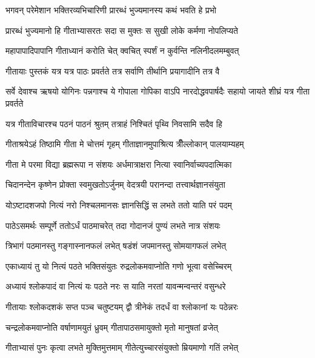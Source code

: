 \twolineshloka
{भगवन् परेमेशान भक्तिरव्यभिचारिणी}
{प्रारब्धं भुज्यमानस्य कथं भवति हे प्रभो}%

\twolineshloka
{प्रारब्धं भुज्यमानो हि गीताभ्यासरतः सदा}
{स मुक्तः स सुखी लोके कर्मणा नोपलिप्यते}%

\twolineshloka
{महापापादिपापानि गीताध्यानं करोति चेत्}
{क्वचित् स्पर्शं न कुर्वन्ति नलिनीदलमम्बुवत्}%

\twolineshloka
{गीतायाः पुस्तकं यत्र यत्र पाठः प्रवर्तते}
{तत्र सर्वाणि तीर्थानि प्रयागादीनि तत्र वै}%

\threelineshloka
{सर्वे देवाश्च ऋषयो योगिनः पन्नगाश्च ये}
{गोपाला गोपिका वाऽपि नारदोद्धवपार्षदैः}
{सहायो जायते शीघ्रं यत्र गीता प्रवर्तते}%

\twolineshloka
{यत्र गीताविचारश्च पठनं पाठनं श्रुतम्}
{तत्राहं निश्चितं पृथ्वि निवसामि सदैव हि}%

\twolineshloka
{गीताश्रयेऽहं तिष्ठामि गीता मे चोत्तमं गृहम्}
{गीताज्ञानमुपाश्रित्य त्रीँल्लोकान् पालयाम्यहम्}%

\twolineshloka
{गीता मे परमा विद्या ब्रह्मरूपा न संशयः}
{अर्धमात्राक्षरा नित्या स्वानिर्वाच्यपदात्मिका}%

\twolineshloka
{चिदानन्देन कृष्णेन प्रोक्ता स्वमुखतोऽर्जुनम्}
{वेदत्रयी परानन्दा तत्त्वार्थज्ञानसंयुता}%

\twolineshloka
{योऽष्टादशजपो नित्यं नरो निश्चलमानसः}
{ज्ञानसिद्धिं स लभते ततो याति परं पदम्}%

\twolineshloka
{पाठेऽसमर्थः सम्पूर्णे ततोऽर्धं पाठमाचरेत्}
{तदा गोदानजं पुण्यं लभते नात्र संशयः}%

\twolineshloka
{त्रिभागं पठमानस्तु गङ्गास्नानफलं लभेत्}
{षडंशं जपमानस्तु सोमयागफलं लभेत्}%

\twolineshloka
{एकाध्यायं तु यो नित्यं पठते भक्तिसंयुतः}
{रुद्रलोकमवाप्नोति गणो भूत्वा वसेच्चिरम्}%

\twolineshloka
{अध्यायं श्लोकपादं वा नित्यं यः पठते नरः}
{स याति नरतां यावन्मन्वन्तरं वसुन्धरे}%

\twolineshloka
{गीतायाः श्लोकदशकं सप्त पञ्च चतुष्टयम्}
{द्वौ त्रीनेकं तदर्धं वा श्लोकानां यः पठेन्नरः}%

\twolineshloka
{चन्द्रलोकमवाप्नोति वर्षाणामयुतं ध्रुवम्}
{गीतापाठसमायुक्तो मृतो मानुषतां व्रजेत्}%

\twolineshloka
{गीताभ्यासं पुनः कृत्वा लभते मुक्तिमुत्तमाम्}
{गीतेत्युच्चारसंयुक्तो म्रियमाणो गतिं लभेत्}%

